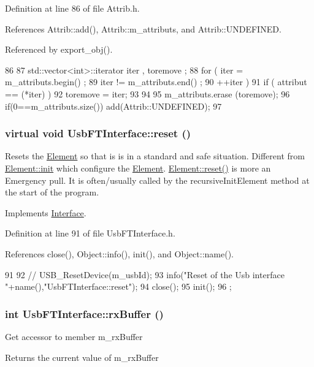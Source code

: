 Definition at line 86 of file Attrib.h.

References Attrib::add(), Attrib::m\_\-attributs, and Attrib::UNDEFINED.

Referenced by export\_\-obj().


\begin{DoxyCode}
86                                {
87     std::vector<int>::iterator iter , toremove ;
88     for ( iter  = m_attributs.begin() ;
89           iter != m_attributs.end()   ;
90           ++iter ) {
91       if ( attribut == (*iter) ) {
92         toremove = iter;
93       }
94     }
95     m_attributs.erase (toremove);
96     if(0==m_attributs.size()) add(Attrib::UNDEFINED);
97   }
\end{DoxyCode}
\hypertarget{classUsbFTInterface_a7bd95c22da69daeaad7f752f560740f4}{
\subsubsection[{reset}]{\setlength{\rightskip}{0pt plus 5cm}virtual void UsbFTInterface::reset ()}}
\label{classUsbFTInterface_a7bd95c22da69daeaad7f752f560740f4}
Resets the \hyperlink{classElement}{Element} so that is is in a standard and safe situation. Different from \hyperlink{classElement_af42754b5cabc198869222725218d695c}{Element::init} which configure the \hyperlink{classElement}{Element}. \hyperlink{classElement_a69efffa22f06909d768149715565cb56}{Element::reset()} is more an Emergency pull. It is often/usually called by the recursiveInitElement method at the start of the program. 

Implements \hyperlink{classInterface_a4d44329cea9981a9e0392eaaf99efadd}{Interface}.

Definition at line 91 of file UsbFTInterface.h.

References close(), Object::info(), init(), and Object::name().


\begin{DoxyCode}
91                        {
92     //    USB_ResetDevice(m_usbId);
93     info("Reset of the Usb interface "+name(),"UsbFTInterface::reset");
94     close();
95     init();
96   };
\end{DoxyCode}
\hypertarget{classUsbFTInterface_a836d1a8d181fd49e11235bb677e3fa7e}{
\subsubsection[{rxBuffer}]{\setlength{\rightskip}{0pt plus 5cm}int UsbFTInterface::rxBuffer ()}}
\label{classUsbFTInterface_a836d1a8d181fd49e11235bb677e3fa7e}
Get accessor to member m\_\-rxBuffer \begin{DoxyReturn}{Returns}
the current value of m\_\-rxBuffer 
\end{DoxyReturn}


